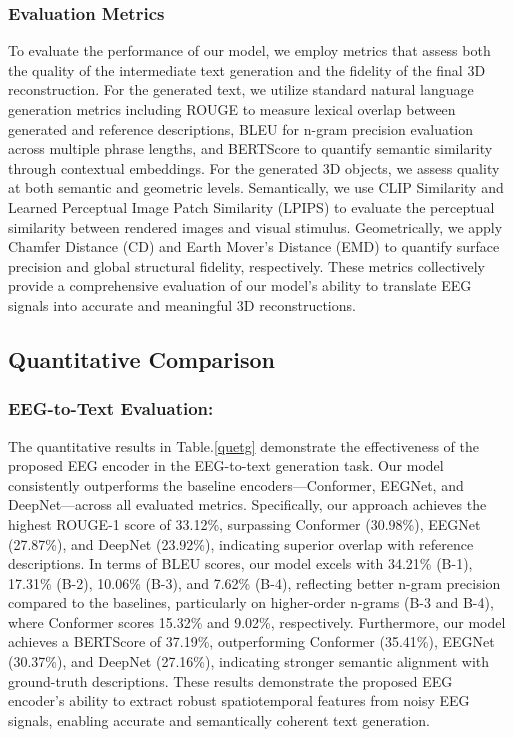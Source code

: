 \documentclass[sigconf]{acmart}
\begin{document}
\subsubsection*{\textbf{Evaluation Metrics}}
To evaluate the performance of our model, we employ metrics that assess both the quality of the intermediate text generation and the fidelity of the final 3D reconstruction. For the generated text, we utilize standard natural language generation metrics including ROUGE \cite{lin2004rouge} to measure lexical overlap between generated and reference descriptions, BLEU \cite{papineni2002bleu} for n-gram precision evaluation across multiple phrase lengths, and BERTScore \cite{zhang2019bertscore}  to quantify semantic similarity through contextual embeddings. 
For the generated 3D objects, we assess quality at both semantic and geometric levels. Semantically, we use CLIP Similarity \cite{radford2021learning} and Learned Perceptual Image Patch Similarity (LPIPS) \cite{zhang2018unreasonable} to evaluate the perceptual similarity between rendered images and visual stimulus. Geometrically, we apply Chamfer Distance (CD) \cite{fan2017point} and Earth Mover’s Distance (EMD) \cite{ling2007shape} to quantify surface precision and global structural fidelity, respectively. These metrics collectively provide a comprehensive evaluation of our model’s ability to translate EEG signals into accurate and meaningful 3D reconstructions.

\subsection{Quantitative Comparison}
\subsubsection*{\textbf{EEG-to-Text Evaluation:}}
The quantitative results in Table.\ref{quetg} demonstrate the effectiveness of the proposed EEG encoder in the EEG-to-text generation task. Our model consistently outperforms the baseline encoders---Conformer, EEGNet, and DeepNet---across all evaluated metrics. Specifically, our approach achieves the highest ROUGE-1 score of 33.12\%, surpassing Conformer (30.98\%), EEGNet (27.87\%), and DeepNet (23.92\%), indicating superior overlap with reference descriptions. In terms of BLEU scores, our model excels with 34.21\% (B-1), 17.31\% (B-2), 10.06\% (B-3), and 7.62\% (B-4), reflecting better n-gram precision compared to the baselines, particularly on higher-order n-grams (B-3 and B-4), where Conformer scores 15.32\% and 9.02\%, respectively. Furthermore, our model achieves a BERTScore of 37.19\%, outperforming Conformer (35.41\%), EEGNet (30.37\%), and DeepNet (27.16\%), indicating stronger semantic alignment with ground-truth descriptions. These results demonstrate the proposed EEG encoder’s ability to extract robust spatiotemporal features from noisy EEG signals, enabling accurate and semantically coherent text generation.
\end{document}
